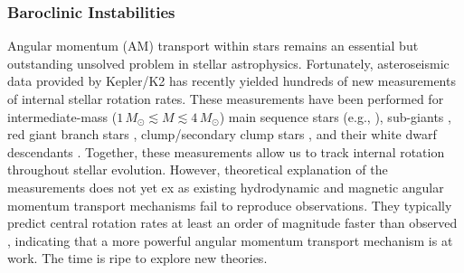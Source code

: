{\color{orange}

\subsubsection{Baroclinic Instabilities}
}

Angular momentum (AM) transport within stars remains an essential but outstanding unsolved problem in stellar astrophysics. Fortunately, asteroseismic data provided by Kepler/K2 has recently yielded hundreds of new measurements of internal stellar rotation rates. These measurements have been performed for intermediate-mass ($1 \, M_\odot \! \lesssim \! M \! \lesssim \! 4 \, M_\odot$) main sequence stars (e.g., \citealt{benomar:15,vanreeth:16}), sub-giants \citep{deheuvels:14}, red giant branch stars \citep{beck:12,mosser:12}, clump/secondary clump stars \citep{mosser:12,deheuvels:15}, and their white dwarf descendants \citep{hermes:17}. Together, these measurements allow us to track internal rotation throughout stellar evolution. However, theoretical explanation of the measurements does not yet ex as existing hydrodynamic and magnetic angular momentum transport mechanisms fail to reproduce observations. They typically predict central rotation rates at least an order of magnitude faster than observed \citep{cantiello:14,fullerwave:14}, indicating that a more powerful angular momentum transport mechanism is at work. The time is ripe to explore new theories.

